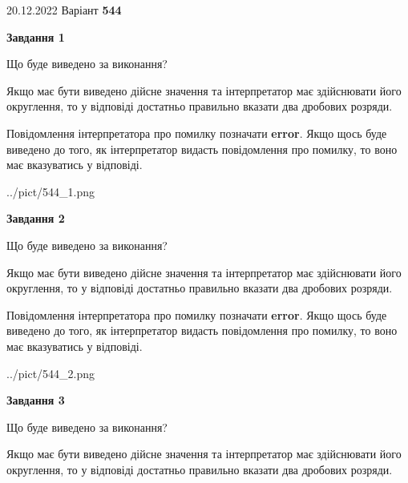 \documentclass[12pt, ukrainian]{article}
\begin{document}
{20.12.2022 Варіант \No \textbf { 544 }\par}
{
\begin {Large}

{\begin {center}\textbf{Завдання 1}\end {center}}\par
Що буде виведено за виконання? \par

Якщо має бути виведено дійсне значення та інтерпретатор має здійснювати його округлення, 
то у відповіді достатньо правильно вказати два дробових розряди.

Повідомлення інтерпретатора про помилку позначати \textbf{error}.
Якщо щось буде виведено до того, як інтерпретатор видасть повідомлення про помилку, 
то воно має вказуватись у відповіді. \par

\begin{center}
	{../pict/544_1.png}
\end{center}
\newpage

{\begin {center}\textbf{Завдання 2}\end {center}}\par
Що буде виведено за виконання? \par

Якщо має бути виведено дійсне значення та інтерпретатор має здійснювати його округлення, 
то у відповіді достатньо правильно вказати два дробових розряди.

Повідомлення інтерпретатора про помилку позначати \textbf{error}.
Якщо щось буде виведено до того, як інтерпретатор видасть повідомлення про помилку, 
то воно має вказуватись у відповіді. \par

\begin{center}
	{../pict/544_2.png}
\end{center}
\newpage

{\begin {center}\textbf{Завдання 3}\end {center}}\par
Що буде виведено за виконання? \par

Якщо має бути виведено дійсне значення та інтерпретатор має здійснювати його округлення, 
то у відповіді достатньо правильно вказати два дробових розряди.


\end{Large}}
\end{document}
